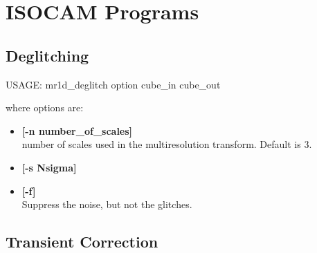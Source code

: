 \chapter{ISOCAM Programs}

 
\section*{Deglitching}

\begin{center}
 USAGE: mr1d\_deglitch option cube\_in cube\_out
\end{center}
where options are:
\begin{itemize}
\item {\bf [-n number\_of\_scales]} \\
number of scales used in the multiresolution transform. Default is 3.
\item {\bf [-s Nsigma]} \\
\item {\bf [-f]} \\
Suppress the noise, but not the glitches.
\end{itemize}

\section*{Transient Correction}

